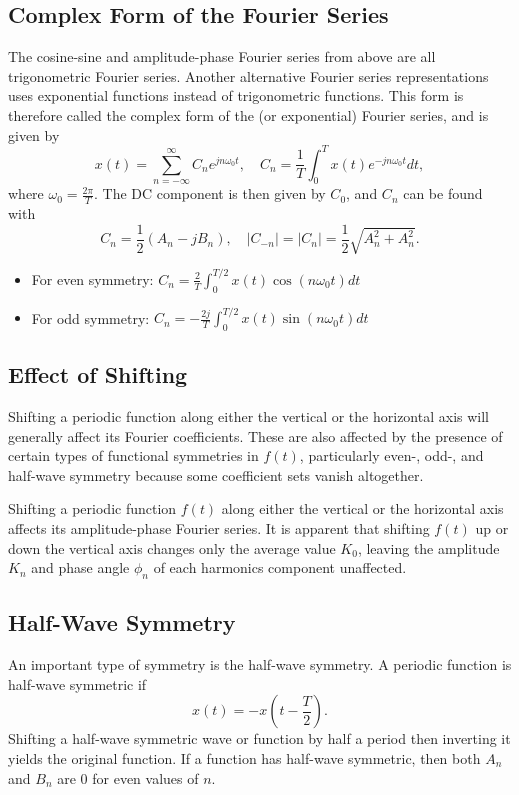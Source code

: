 \documentclass{article}
\begin{document}
\subsection{Complex Form of the Fourier Series}
The cosine-sine and amplitude-phase Fourier series from above are all trigonometric Fourier series. Another alternative Fourier series representations uses exponential functions instead of trigonometric functions. This form is therefore called the complex form of the (or exponential) Fourier series, and is given by
\[
    x(t)=\sum_{n=-\infty}^{\infty} C_ne^{jn\omega _0t},\quad C_n=\frac{1}{T}\int_0^Tx(t)e^{-jn\omega _0t}dt,
\]
where $\omega _0=\frac{2\pi }{T}$. The DC component is then given by $C_0$, and $C_n$ can be found with
\[
    C_n=\frac{1}{2}(A_n-jB_n),\quad |C_{-n}|=|C_n|=\frac{1}{2}\sqrt{A_n^2+A_n^2}.
\]
\begin{itemize}
    \item For even symmetry: $C_n=\frac{2}{T}\int_0^{T/2}x(t)\cos(n\omega _0t)dt$
    \item For odd symmetry: $C_n=-\frac{2j}{T}\int_0^{T/2}x(t)\sin(n\omega _0t)dt$
\end{itemize}

\subsection{Effect of Shifting}
Shifting a periodic function along either the vertical or the horizontal axis will generally affect its Fourier coefficients. These are also affected by the presence of certain types of functional symmetries in $f(t)$, particularly even-, odd-, and half-wave symmetry because some coefficient sets vanish altogether.

Shifting a periodic function $f(t)$ along either the vertical or the horizontal axis affects its amplitude-phase Fourier series. It is apparent that shifting $f(t)$ up or down the vertical axis changes only the average value $K_0$, leaving the amplitude $K_n$ and phase angle $\phi _n$ of each harmonics component unaffected.

\subsection{Half-Wave Symmetry}
An important type of symmetry is the half-wave symmetry. A periodic function is half-wave symmetric if
\[
    x(t)=-x \left( t-\frac{T}{2} \right).
\]
Shifting a half-wave symmetric wave or function by half a period then inverting it yields the original function. If a function has half-wave symmetric, then both $A_n$ and $B_n$ are 0 for even values of $n$.
\end{document}
